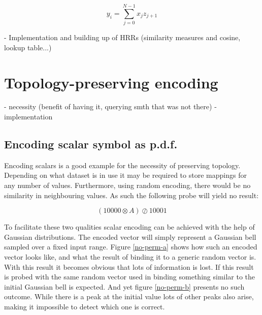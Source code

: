 \documentclass[conference]{IEEEtran}
\begin{document}
	\begin{equation}
	y_i=\sum_{j=0}^{N-1}{x_jz_{j+1}} 
	\end{equation} 
		
	- Implementation and building up of HRRs (similarity measures and cosine, lookup table...)
	
	
	\section{Topology-preserving encoding}
	
	- necessity (benefit of having it, querying smth that was not there)
	- implementation
	

 
	
	\subsection{Encoding scalar symbol as p.d.f.}
	
	Encoding scalars is a good example for the necessity of preserving topology.
Depending on what dataset is in use it may be required to store mappings for any number of values.
Furthermore, using random encoding, there would be no similarity in neighbouring values.
As such the following probe will yield no result:
	
	\begin{equation}
	(10000 \otimes A) \oslash 10001
	\end{equation}
	
	To facilitate these two qualities scalar encoding can be achieved with the help of Gaussian distributions.
The encoded vector will simply represent a Gaussian bell sampled over a fixed input range.
Figure \ref{no-perm-a} shows how such an encoded vector looks like, and what the result of binding it to a generic random vector is.
With this result it becomes obvious that lots of information is lost.
If this result is probed with the same random vector used in binding something similar to the initial Gaussian bell is expected.
And yet figure \ref{no-perm-b} presents no such outcome.
While there is a peak at the initial value lots of other peaks also arise, making it impossible to detect which one is correct.
\end{document}
